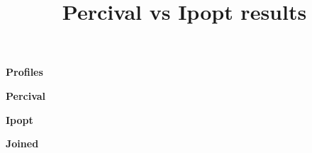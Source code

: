 \documentclass[10pt]{article}
\title{ Percival vs Ipopt results }
\begin{document}
\maketitle

\begin{center}
  \large \bf Profiles
\end{center}


\newpage
\scriptsize
\begin{center}
  \large \bf Percival
\end{center}


\newpage
\begin{center}
  \large \bf Ipopt
\end{center}


\newpage
\begin{center}
  \large \bf Joined
\end{center}


% 
\end{document}
